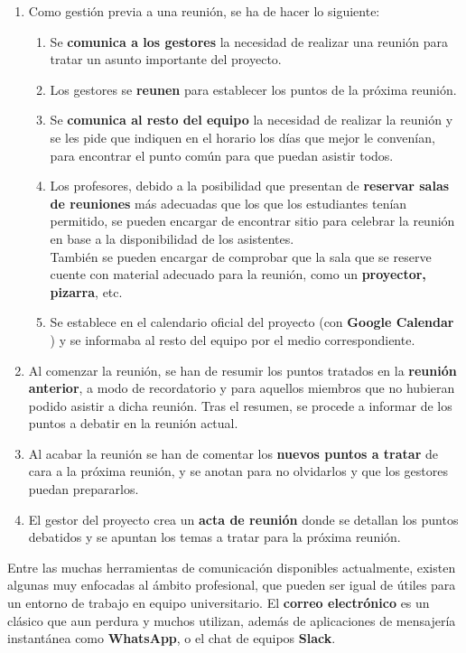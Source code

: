 \begin{enumerate}
    \item Como gestión previa a una reunión, se ha de hacer lo siguiente:
    \begin{enumerate}
        \item Se \textbf{comunica a los gestores} la necesidad de realizar una reunión para tratar un asunto importante del proyecto.
        \item Los gestores se \textbf{reunen} para establecer los puntos de la próxima reunión.
        \item Se \textbf{comunica al resto del equipo} la necesidad de realizar la reunión y se les pide que indiquen en el horario los días que mejor le convenían, para encontrar el punto común para que puedan asistir todos.
        \item Los profesores, debido a la posibilidad que presentan de \textbf{reservar salas de reuniones} más adecuadas que los que los estudiantes tenían permitido, se pueden encargar de encontrar sitio para celebrar la reunión en base a la disponibilidad de los asistentes.\\
        También se pueden encargar de comprobar que la sala que se reserve cuente con material adecuado para la reunión, como un \textbf{proyector, pizarra}, etc.
        \item Se establece en el calendario oficial del proyecto (con \textbf{Google Calendar} \cite{googlecalendar}) y se informaba al resto del equipo por el medio correspondiente.
    \end{enumerate}
    \item Al comenzar la reunión, se han de resumir los puntos tratados en la \textbf{reunión anterior}, a modo de recordatorio y para aquellos miembros que no hubieran podido asistir a dicha reunión. Tras el resumen, se procede a informar de los puntos a debatir en la reunión actual.
    \item Al acabar la reunión se han de comentar los \textbf{nuevos puntos a tratar} de cara a la próxima reunión, y se anotan para no olvidarlos y que los gestores puedan prepararlos.
    \item El gestor del proyecto crea un \textbf{acta de reunión} donde se detallan los puntos debatidos y se apuntan los temas a tratar para la próxima reunión.
\end{enumerate}

Entre las muchas herramientas de comunicación disponibles actualmente, existen algunas muy enfocadas al ámbito profesional, que pueden ser igual de útiles para un entorno de trabajo en equipo universitario. El \textbf{correo electrónico} es un clásico que aun perdura y muchos utilizan, además de aplicaciones de mensajería instantánea como \textbf{WhatsApp}, o el chat de equipos \textbf{Slack}.\\

